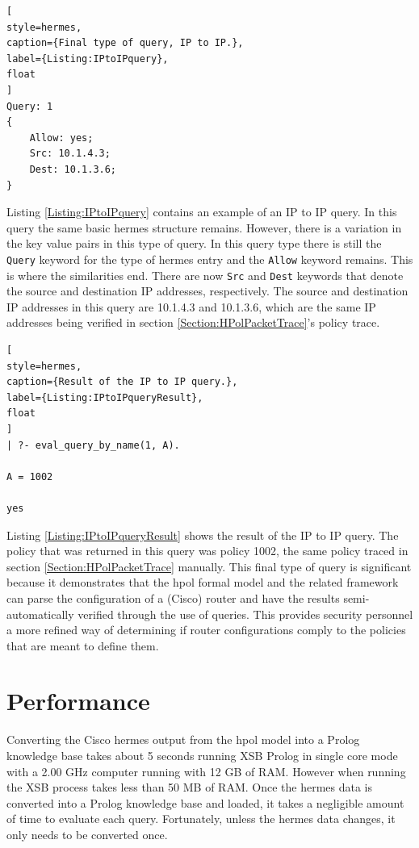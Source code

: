 \documentclass[12pt,letterpaper]{report}
\begin{document}
\begin{lstlisting}[
style=hermes,
caption={Final type of query, IP to IP.},
label={Listing:IPtoIPquery},
float
]
Query: 1
{
	Allow: yes;
	Src: 10.1.4.3;
	Dest: 10.1.3.6;
}
\end{lstlisting}

Listing \ref{Listing:IPtoIPquery} contains an example of an IP to IP query. In this query the same basic \ac{hermes} structure remains. However, there is a variation in the key value pairs in this type of query. In this query type there is still the \texttt{Query} keyword for the type of \ac{hermes} entry and the \texttt{Allow} keyword remains. This is where the similarities end. There are now \texttt{Src} and \texttt{Dest} keywords that denote the source and destination IP addresses, respectively. The source and destination IP addresses in this query are 10.1.4.3 and 10.1.3.6, which are the same IP addresses being verified in section \ref{Section:HPolPacketTrace}'s policy trace.

\begin{lstlisting}[
style=hermes,
caption={Result of the IP to IP query.},
label={Listing:IPtoIPqueryResult},
float
]
| ?- eval_query_by_name(1, A).

A = 1002

yes
\end{lstlisting}

Listing \ref{Listing:IPtoIPqueryResult} shows the result of the IP to IP query. The policy that was returned in this query was policy 1002, the same policy traced in section \ref{Section:HPolPacketTrace} manually. This final type of query is significant because it demonstrates that the \ac{hpol} formal model and the related framework can parse the configuration of a (Cisco) router and have the results semi-automatically verified through the use of queries. This provides security personnel a more refined way of determining if router configurations comply to the policies that are meant to define them.


\section{Performance}
Converting the Cisco \ac{hermes} output from the \ac{hpol} model into a Prolog knowledge base takes about 5 seconds running XSB Prolog in single core mode with a 2.00 GHz computer running with 12 GB of RAM. However when running the XSB process takes less than 50 MB of RAM. Once the \ac{hermes} data is converted into a Prolog knowledge base and loaded, it takes a negligible amount of time to evaluate each query. Fortunately, unless the \ac{hermes} data changes, it only needs to be converted once.
\end{document}
